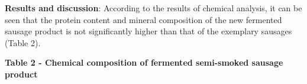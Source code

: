 {\bfseries Results and discussion}: According to the results of chemical
analysis, it can be seen that the protein content and mineral
composition of the new fermented sausage product is not significantly
higher than that of the exemplary sausages (Table 2).

{\bfseries Table 2 - Chemical composition of fermented semi-smoked sausage
product}


